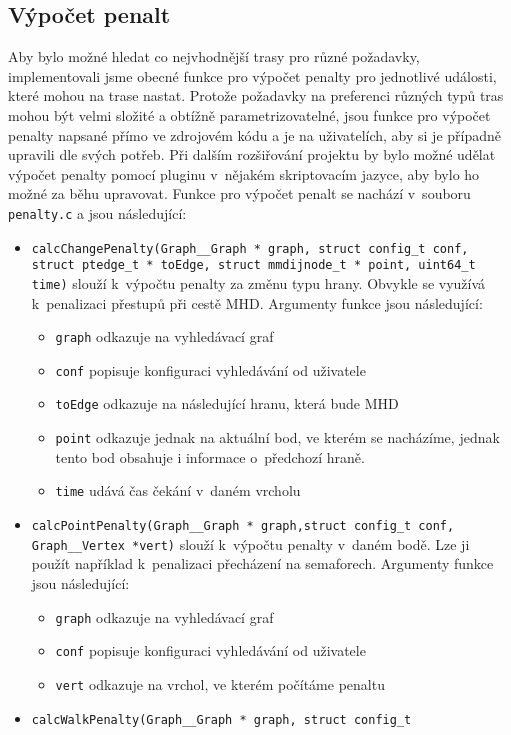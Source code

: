 \subsection{Výpočet penalt}
Aby bylo možné hledat co nejvhodnější trasy pro různé požadavky, implementovali
jsme obecné funkce pro výpočet penalty pro jednotlivé události, které mohou na
trase nastat. Protože požadavky na preferenci různých typů tras mohou být velmi
složité a obtížně parametrizovatelné, jsou funkce pro výpočet penalty napsané
přímo ve zdrojovém kódu a je na uživatelích, aby si je případně upravili dle
svých potřeb. Při dalším rozšiřování projektu by bylo možné udělat výpočet
penalty pomocí pluginu v~nějakém skriptovacím jazyce, aby bylo ho možné za běhu
upravovat. Funkce pro výpočet penalt se nachází v~souboru {\tt penalty.c} a jsou následující: 
\begin{itemize}
	\item {\tt calcChangePenalty(Graph\_\_Graph * graph, struct config\_t conf,
	struct ptedge\_t * toEdge, struct mmdijnode\_t * point, uint64\_t time)}
	slouží k~výpočtu penalty za změnu typu hrany. Obvykle se využívá
k~penalizaci přestupů při cestě MHD.
	Argumenty funkce jsou následující:
	\begin{itemize}
		\item {\tt graph} odkazuje na vyhledávací graf
		\item {\tt conf} popisuje konfiguraci vyhledávání od uživatele
		\item {\tt toEdge} odkazuje na následující hranu, která bude MHD   
		\item {\tt point} odkazuje jednak na aktuální bod, ve kterém se
		nacházíme, jednak tento bod obsahuje i informace o~předchozí
		hraně.
		\item {\tt time} udává čas čekání v~daném vrcholu
	\end{itemize}
	\item {\tt calcPointPenalty(Graph\_\_Graph * graph,struct config\_t conf,
	Graph\_\_Vertex *vert)} slouží k~výpočtu penalty v~daném bodě. Lze ji
	použít například k~penalizaci přecházení na semaforech. Argumenty
	funkce jsou následující:
	\begin{itemize}
		\item {\tt graph} odkazuje na vyhledávací graf
		\item {\tt conf} popisuje konfiguraci vyhledávání od uživatele
		\item {\tt vert} odkazuje na vrchol, ve kterém počítáme penaltu
	\end{itemize}
	\item {\tt calcWalkPenalty(Graph\_\_Graph * graph, struct config\_t
}
\end{itemize}
